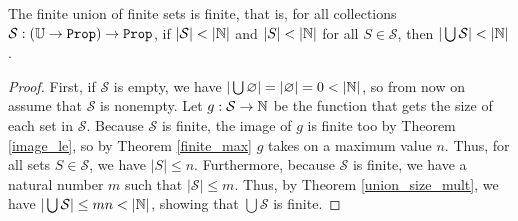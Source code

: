 \documentclass[../../math.tex]{subfiles}
\begin{document}
\begin{theorem} \label{finite_union_finite}
    The finite union of finite sets is finite, that is, for all collections
    $\mathcal S : (\U \to \Prop) \to \Prop$, if $|\mathcal S| < |\mathbb{N}|$ and $|S| <
    |\mathbb{N}|$ for all $S \in \mathcal S$, then $|\bigcup \mathcal S| < |\mathbb{N}|$.
\end{theorem}
\begin{proof}
    First, if $\mathcal S$ is empty, we have $|\bigcup \varnothing| =
    |\varnothing| = 0 < |\mathbb{N}|$, so from now on assume that $\mathcal S$ is
    nonempty.  Let $g : \mathcal S \to \mathbb{N}$ be the function that gets the size of
    each set in $\mathcal S$.  Because $\mathcal S$ is finite, the image of $g$
    is finite too by Theorem \ref{image_le}, so by Theorem \ref{finite_max} $g$
    takes on a maximum value $n$.  Thus, for all sets $S \in \mathcal S$, we
    have $|S| \leq n$.  Furthermore, because $\mathcal S$ is finite, we have a
    natural number $m$ such that $|\mathcal S| \leq m$.  Thus, by Theorem
    \ref{union_size_mult}, we have $|\bigcup \mathcal S| \leq mn < |\mathbb{N}|$,
    showing that $\bigcup \mathcal S$ is finite.
\end{proof}
\end{document}
